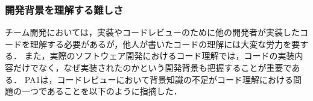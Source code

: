 \subsubsection*{開発背景を理解する難しさ}




チーム開発においては，実装やコードレビューのために他の開発者が実装したコードを理解する必要があるが，他人が書いたコードの理解には大変な労力を要する．
また，実際のソフトウェア開発におけるコード理解では，コードの実装内容だけでなく，なぜ実装されたのかという開発背景も把握することが重要である．
PA1は，コードレビューにおいて背景知識の不足がコード理解における問題の一つであることを以下のように指摘した．




